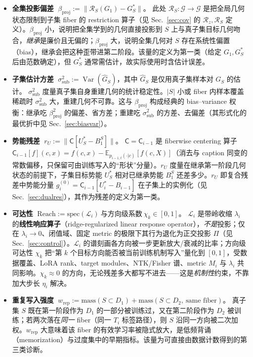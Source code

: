 \documentclass[11pt,a4paper]{article}
\DeclareMathOperator{\Var}{Var}
\newcommand{\E}{\mathbb{E}}
\newcommand{\cL}{\mathcal{L}}   %
\newcommand{\cG}{\mathcal{G}}   %
\newcommand{\Rstr}{\mathcal{R}}     %
\newcommand{\Center}{\mathsf{C}}    %
\newcommand{\ProjectOp}{\Pi}        %
\begin{document}
\begin{itemize}
\item \textbf{全集投影偏差} $\;\beta_{\mathrm{proj}}:=\|\Rstr_S(G_1)-G_S^*\|$。\;
此处 $\Rstr_S:\cG\to\cG$ 是把全局几何状态限制到子集 fiber 的 restriction 算子（见 Sec.~\ref{sec:cov} 的 $\Rstr_z,\Rstr_S$ 定义）。$\beta_{\mathrm{proj}}$ 小，说明把全集学到的几何直接投影到 $S$ 上与真子集目标几何吻合，\emph{继承}是廉价且无偏的；$\beta_{\mathrm{proj}}$ 大，说明全集几何对 $S$ 存在系统性偏置（bias），继承会把这种歪带进第二阶段。该量的定义为第一类（给定 $G_1,G_S^*$ 后由范数确定），但 $G_S^*$ 通常需估计，故实际使用时含估计误差。

\item \textbf{子集估计方差} $\;\sigma_{\mathrm{sub}}^2:=\Var(\widehat{G}_S)$，其中 $\widehat{G}_S$ 是仅用真子集样本对 $G_S$ 的估计。\;
$\sigma_{\mathrm{sub}}^2$ 度量真子集自身重建几何的统计稳定性。$|S|$ 小或 fiber 内样本覆盖稀疏时 $\sigma_{\mathrm{sub}}^2$ 大，重建几何不可靠。这与 $\beta_{\mathrm{proj}}$ 构成经典的 bias--variance 权衡：继承吃 $\beta_{\mathrm{proj}}^2$ 的偏差、省方差；重建吃 $\sigma_{\mathrm{sub}}^2$ 的方差、去偏差（其形式化的最优折中见 Sec.~\ref{sec:biasvar}）。

\item \textbf{势能残差} $\;r_U:=\|\Center[U_S^*-B_1^S]\|$。\;
$\Center=\Center_{i-1}$ 是 fiberwise centering 算子 $\Center_{i-1}[f](c,x)=f(c,x)-\E_{p_{i-1,t}(\cdot|c)}[f(c,X)]$（消去与 caption 同变的常数偏移，只保留可由训练写入的“形状”分量）。$r_U$ 度量在继承第一阶段几何状态的前提下，子集目标势能 $U_S^*$ 相对已继承势能 $B_1^S$ 还差多少。$r_U$ 即复合残差中势能分量 $g_i^{(0)}=\Center_{i-1}[U_i^*-B_{i-1}]$ 在子集上的实例化（见 Sec.~\ref{sec:dualres}），其作为残差的定义为第一类。

\item \textbf{可达性} $\;\mathrm{Reach}:=\mathrm{spec}(\cL_i)\ \text{与方向级系数}\ \chi_k\in[0,1]$。\;
$\cL_i$ 是带岭收缩 $\lambda_i$ 的\textbf{线性响应算子}（ridge-regularized linear response operator），\emph{不是}投影；仅在 $\lambda_i\to0$、闭值域、固定 metric 的极限下其行为退化为正交投影 $\ProjectOp$（见 Sec.~\ref{sec:control}）。$\cL_i$ 的谱刻画各方向被一步更新放大/衰减的比率；方向级可达性 $\chi_k$ 把“第 $k$ 个目标方向能否被当前训练机制写入”量化到 $[0,1]$，受数据覆盖、LoRA rank、target modules、NTK/Fisher 谱、metric $M_i$ 与 $\lambda_i$ 共同影响。$\chi_k\approx0$ 的方向，无论残差多大都写不进去——这是\emph{机制性}约束，不靠加大步长 $\eta_i$ 解决。

\item \textbf{重复写入强度} $\;w_{\mathrm{rep}}:=\mathrm{mass}(S\subset D_1)+\mathrm{mass}(S\subset D_2,\ \text{same fiber})$。\;
真子集 $S$ 既在第一阶段作为 $D_1$ 的一部分被训练过，又在第二阶段作为 $D_2$ 被训练；若两次落在\emph{同一} fiber（同一 $T_i$ 标签路径），则 $S$ 沿同一方向被二次加权。$w_{\mathrm{rep}}$ 大意味着该 fiber 的有效学习率被隐式放大，是低频背诵（memorization）与过度集中的早期指标。该量为可直接由数据计数得到的第三类诊断。


\end{itemize}
\end{document}

